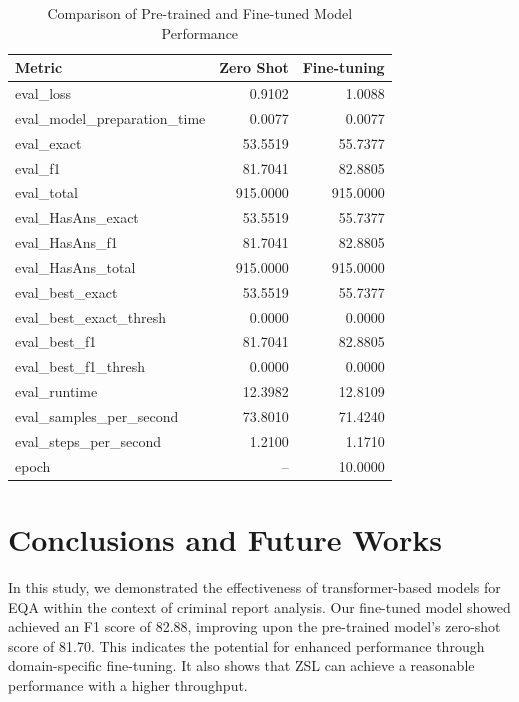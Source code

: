\documentclass[runningheads]{llncs}
\begin{document}
\begin{table}[ht]
  \centering
  \caption{Comparison of Pre-trained and Fine-tuned Model Performance}
  \label{tab:comparative-results}
  \small
  \begin{tabular}{lrr}
\toprule
Metric & Zero Shot & Fine-tuning \\
\midrule
eval\_loss                   & 0.9102  & 1.0088    \\
eval\_model\_preparation\_time & 0.0077  & 0.0077    \\
eval\_exact                  & 53.5519 & 55.7377   \\
eval\_f1                     & 81.7041 & 82.8805   \\
eval\_total                  & 915.0000 & 915.0000 \\
eval\_HasAns\_exact          & 53.5519 & 55.7377   \\
eval\_HasAns\_f1             & 81.7041 & 82.8805   \\
eval\_HasAns\_total          & 915.0000 & 915.0000 \\
eval\_best\_exact            & 53.5519 & 55.7377   \\
eval\_best\_exact\_thresh    & 0.0000  & 0.0000    \\
eval\_best\_f1               & 81.7041 & 82.8805   \\
eval\_best\_f1\_thresh       & 0.0000  & 0.0000    \\
eval\_runtime                & 12.3982 & 12.8109   \\
eval\_samples\_per\_second   & 73.8010 & 71.4240   \\
eval\_steps\_per\_second     & 1.2100  & 1.1710    \\
epoch                       & --      & 10.0000   \\
\bottomrule
  \end{tabular}
\end{table}

\newpage
\section{Conclusions and Future Works}
\label{sec:conclusions}
In this study, we demonstrated the effectiveness of transformer-based
models for \ac{EQA} within the context of criminal report
analysis. Our fine-tuned model showed achieved an F1 score of 82.88,
improving upon the pre-trained model's zero-shot score of 81.70. This
indicates the potential for enhanced performance through
domain-specific fine-tuning. It also shows that \ac{ZSL} can achieve a
reasonable performance with a higher throughput.
\end{document}
